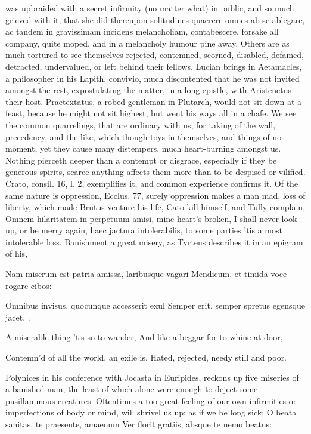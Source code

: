 {was upbraided with a secret infirmity (no matter what) in public, and
so much grieved with it, that she did thereupon solitudines quaerere
omnes ab se ablegare, ac tandem in gravissimam incidens melancholiam,
contabescere, forsake all company, quite moped, and in a melancholy
humour pine away. Others are as much tortured to see themselves
rejected, contemned, scorned, disabled, defamed, detracted,
undervalued, or left behind their fellows. Lucian brings in
Aetamacles, a philosopher in his Lapith. convivio, much discontented
that he was not invited amongst the rest, expostulating the matter, in
a long epistle, with Aristenetus their host. Praetextatus, a robed
gentleman in Plutarch, would not sit down at a feast, because he might
not sit highest, but went his ways all in a chafe. We see the common
quarrelings, that are ordinary with us, for taking of the wall,
precedency, and the like, which though toys in themselves, and things
of no moment, yet they cause many distempers, much heart-burning
amongst us. Nothing pierceth deeper than a contempt or disgrace,
especially if they be generous spirits, scarce anything affects
them more than to be despised or vilified. Crato, consil. 16, l. 2,
exemplifies it, and common experience confirms it. Of the same nature
is oppression, Ecclus. 77, surely oppression makes a man mad, loss of
liberty, which made Brutus venture his life, Cato kill himself, and
Tully complain, Omnem hilaritatem in perpetuum amisi, mine
heart's broken, I shall never look up, or be merry again, haec
jactura intolerabilis, to some parties 'tis a most intolerable loss.
Banishment a great misery, as Tyrteus describes it in an epigram of
his,

Nam miserum est patria amissa, laribusque vagari
Mendicum, et timida voce rogare cibos:

Omnibus invisus, quocunque accesserit exul
Semper erit, semper spretus egensque jacet, \etc{}.


A miserable thing 'tis so to wander,
And like a beggar for to whine at door,

Contemn'd of all the world, an exile is,
Hated, rejected, needy still and poor.

Polynices in his conference with Jocasta in Euripides, reckons up
five miseries of a banished man, the least of which alone were enough
to deject some pusillanimous creatures. Oftentimes a too great feeling
of our own infirmities or imperfections of body or mind, will shrivel
us up; as if we be long sick:
O beata sanitas, te praesente, amaenum
Ver florit gratiis, absque te nemo beatus:

}
